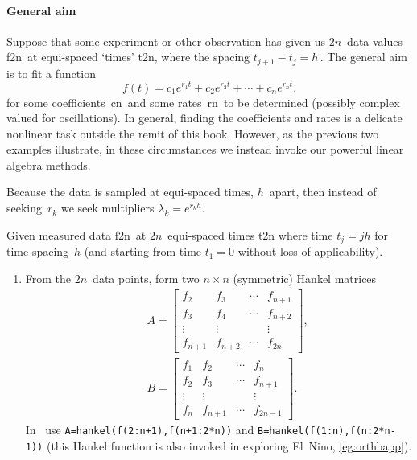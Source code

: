 \begin{draft}
\paragraph{General aim}
Suppose that some experiment or other observation has given us \(2n\)~data values \hlist f{2n}\ at equi-spaced `times' \hlist t{2n}, where the spacing \(t_{j+1}-t_j=h\)\,.
The general aim is to fit a function \cite[\S2.6, e.g.]{Cuyt2015}
\begin{equation}
f(t)=c_1e^{r_1t}+c_2e^{r_2t}+\cdots+c_ne^{r_nt}.
\end{equation}
for some coefficients~\hlist cn\ and some rates~\hlist rn\ to be determined (possibly complex valued for oscillations).
In general, finding the coefficients and rates is a delicate nonlinear task outside the remit of this book.
However, as the previous two examples illustrate, in these circumstances we instead invoke our powerful linear algebra methods.

Because the data is sampled at equi-spaced times, \(h\)~apart, then instead of seeking~\(r_k\) we seek multipliers \(\lambda_k=e^{r_kh}\).

\begin{procedure} \label{pro:ei}
Given measured data \hlist f{2n}\ at \(2n\)~equi-spaced times \hlist t{2n} where time \(t_j=jh\) for time-spacing~\(h\) (and starting from time \(t_1=0\) without loss of applicability).
\begin{enumerate}
\item From the \(2n\)~data points, form two \(n\times n\) (symmetric) Hankel matrices 
\begin{eqnarray*}&&
A=\begin{bmatrix} f_2&f_3&\cdots&f_{n+1}
\\f_3&f_4&\cdots&f_{n+2}
\\\vdots&\vdots&&\vdots
\\f_{n+1}&f_{n+2}&\cdots&f_{2n} \end{bmatrix},
\\&&
B=\begin{bmatrix} f_1&f_2&\cdots&f_{n}
\\f_2&f_3&\cdots&f_{n+1}
\\\vdots&\vdots&&\vdots
\\f_{n}&f_{n+1}&\cdots&f_{2n-1} \end{bmatrix}.
\end{eqnarray*}
In \script\ use \verb|A=hankel(f(2:n+1),f(n+1:2*n))| and \verb|B=hankel(f(1:n),f(n:2*n-1))| (this Hankel function is also invoked in exploring El~Nino, \autoref{eg:orthbapp}).


\end{enumerate}
\end{procedure}
\end{draft}

